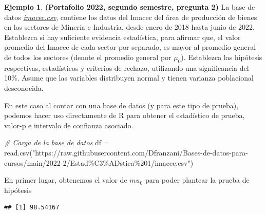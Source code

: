 \documentclass[
]{book}
\newenvironment{Shaded}{\begin{snugshade}}{\end{snugshade}}
\newcommand{\CommentTok}[1]{\textcolor[rgb]{0.56,0.35,0.01}{\textit{#1}}}
\newcommand{\FunctionTok}[1]{\textcolor[rgb]{0.00,0.00,0.00}{#1}}
\newcommand{\NormalTok}[1]{#1}
\newcommand{\OtherTok}[1]{\textcolor[rgb]{0.56,0.35,0.01}{#1}}
\newcommand{\SpecialCharTok}[1]{\textcolor[rgb]{0.00,0.00,0.00}{#1}}
\newcommand{\StringTok}[1]{\textcolor[rgb]{0.31,0.60,0.02}{#1}}
\theoremstyle{definition}
\theoremstyle{definition}
\newtheorem{example}{Ejemplo}[chapter]
\theoremstyle{definition}
\theoremstyle{definition}
\theoremstyle{remark}
\begin{document}
\begin{example}
\protect\hypertarget{exm:imacec}{}\label{exm:imacec}\textbf{(Portafolio 2022, segundo semestre, pregunta 2)} La base de datos \href{https://raw.githubusercontent.com/Dfranzani/Bases-de-datos-para-cursos/main/2022-2/Estad\%C3\%ADstica\%201/imacec.csv}{\emph{imacec.csv}}, contiene los datos del Imacec del área de producción de bienes en los sectores de Minería e Industria, desde enero de 2018 hasta junio de 2022. Establezca si hay suficiente evidencia estadística, para afirmar que, el valor promedio del Imacec de cada sector por separado, es mayor al promedio general de todos los sectores (denote el promedio general por \(\mu_0\)). Establezca las hipótesis respectivas, estadísticos y criterios de rechazo, utilizando una significancia del 10\%. Asume que las variables distribuyen normal y tienen varianza poblacional desconocida.

En este caso al contar con una base de datos (y para este tipo de prueba), podemos hacer uso directamente de R para obtener el estadístico de prueba, valor-p e intervalo de confianza asociado.

\begin{Shaded}
\begin{Highlighting}[]
\CommentTok{\# Carga de la base de datos}
\NormalTok{df }\OtherTok{=} \FunctionTok{read.csv}\NormalTok{(}\StringTok{"https://raw.githubusercontent.com/Dfranzani/Bases{-}de{-}datos{-}para{-}cursos/main/2022{-}2/Estad\%C3\%ADstica\%201/imacec.csv"}\NormalTok{)}
\end{Highlighting}
\end{Shaded}

En primer lugar, obtenemos el valor de \(mu_0\) para poder plantear la prueba de hipótesis

\begin{Shaded}
\end{Shaded}

\begin{verbatim}
## [1] 98.54167
\end{verbatim}


\end{example}
\end{document}
